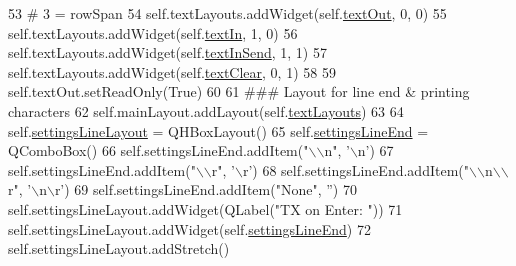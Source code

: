 \begin{DoxyCode}
53         \textcolor{comment}{# 3 = rowSpan}
54         self.textLayouts.addWidget(self.\hyperlink{classsoftware_1_1chipwhisperer_1_1capture_1_1utils_1_1SerialTerminalDialog_1_1SerialTerminalDialog_a5e90a4524b680cfc7e6d53b878e5e15a}{textOut}, 0, 0)
55         self.textLayouts.addWidget(self.\hyperlink{classsoftware_1_1chipwhisperer_1_1capture_1_1utils_1_1SerialTerminalDialog_1_1SerialTerminalDialog_a4ebec418cfdef68115285495e77a0e2b}{textIn}, 1, 0)
56         self.textLayouts.addWidget(self.\hyperlink{classsoftware_1_1chipwhisperer_1_1capture_1_1utils_1_1SerialTerminalDialog_1_1SerialTerminalDialog_a5563dd1c3242f3ca0ccc11ba9f3cf73a}{textInSend}, 1, 1)
57         self.textLayouts.addWidget(self.\hyperlink{classsoftware_1_1chipwhisperer_1_1capture_1_1utils_1_1SerialTerminalDialog_1_1SerialTerminalDialog_a3184bbb3beadd95fbecb26ff2ca2d5df}{textClear}, 0, 1)
58 
59         self.textOut.setReadOnly(\textcolor{keyword}{True})
60 
61         \textcolor{comment}{### Layout for line end & printing characters}
62         self.mainLayout.addLayout(self.\hyperlink{classsoftware_1_1chipwhisperer_1_1capture_1_1utils_1_1SerialTerminalDialog_1_1SerialTerminalDialog_aa8c739ae1085d049851e7d3876518a6f}{textLayouts})
63 
64         self.\hyperlink{classsoftware_1_1chipwhisperer_1_1capture_1_1utils_1_1SerialTerminalDialog_1_1SerialTerminalDialog_a3795a575e7f6f52b3e11ba7026a8ffed}{settingsLineLayout} = QHBoxLayout()
65         self.\hyperlink{classsoftware_1_1chipwhisperer_1_1capture_1_1utils_1_1SerialTerminalDialog_1_1SerialTerminalDialog_ac89cc24fe19758a88391c782b674482b}{settingsLineEnd} = QComboBox()
66         self.settingsLineEnd.addItem(\textcolor{stringliteral}{"\(\backslash\)\(\backslash\)n"}, \textcolor{stringliteral}{'\(\backslash\)n'})
67         self.settingsLineEnd.addItem(\textcolor{stringliteral}{"\(\backslash\)\(\backslash\)}\textcolor{stringliteral}{r", '\(\backslash\)r')}
68 \textcolor{stringliteral}{        self.settingsLineEnd.addItem(}\textcolor{stringliteral}{"\(\backslash\)\(\backslash\)n\(\backslash\)\(\backslash\)}\textcolor{stringliteral}{r", '\(\backslash\)n\(\backslash\)r')}
69 \textcolor{stringliteral}{        self.settingsLineEnd.addItem(}\textcolor{stringliteral}{"None"}, \textcolor{stringliteral}{''})
70         self.settingsLineLayout.addWidget(QLabel(\textcolor{stringliteral}{"TX on Enter: "}))
71         self.settingsLineLayout.addWidget(self.\hyperlink{classsoftware_1_1chipwhisperer_1_1capture_1_1utils_1_1SerialTerminalDialog_1_1SerialTerminalDialog_ac89cc24fe19758a88391c782b674482b}{settingsLineEnd})
72         self.settingsLineLayout.addStretch()

\end{DoxyCode}
